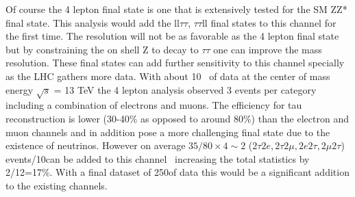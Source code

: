 \documentclass[11pt]{article}
\newcommand{\too}{$\rightarrow$}
\begin{document}
Of course the 4 lepton final state is one that is extensively tested for the SM ZZ* final state. This analysis would add the ll$\tau\tau$, $\tau\tau$ll final states to this channel for the first time.  The resolution will not be as favorable as
the 4 lepton final state but by constraining the on shell Z to decay to $\tau \tau$ one can improve the mass resolution.  These final states can add further sensitivity to this channel specially as the LHC
gathers more data.  With about 10 \invfb\ of data at the center of mass energy $\sqrt s$ = 13 TeV the 4 lepton analysis observed 3 events per category including a combination of electrons and muons.  The efficiency for tau reconstruction is lower (30-40\% as opposed to around 80\%) than the electron and muon channels and in 
addition pose a more challenging final state due to the existence of neutrinos.
However on average $35/80\times4\sim 2$ ($2\tau2e, 2\tau2\mu, 2e2\tau,2\mu2\tau$) events/10\invfb can be added to this channel~\cite{2016:4l} increasing the total statistics by 2/12=17\%. With a final dataset of 250\invfb of data this would be a significant addition to the existing channels.


\end{document}
